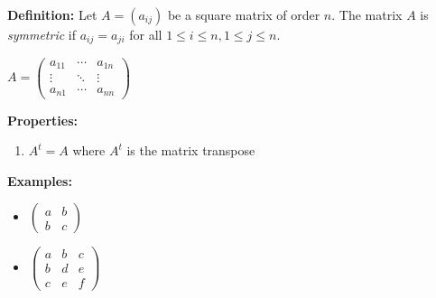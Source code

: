 \documentclass[12pt]{article}
\begin{document}

\textbf{Definition:} \newline Let $A=(a_{ij})$ be a square matrix of
order $n$.  The matrix $A$ is \emph{symmetric} if $a_{ij} = a_{ji}$
for all $1 \leq i \leq n, 1 \leq j \leq n$.
\begin{center}$A =
\begin{pmatrix}
  a_{11} & \cdots & a_{1n} \\
  \vdots & \ddots & \vdots \\
  a_{n1} & \cdots & a_{nn}
\end{pmatrix}$
\end{center}

\textbf{Properties:}
\begin{enumerate}
  \item $A^t = A$ where $A^t$ is the matrix transpose
\end{enumerate}

\textbf{Examples:}
\begin{itemize}
  \item $\begin{pmatrix}
    a & b \\
    b & c 
  \end{pmatrix}$
  \item $\begin{pmatrix}
    a & b & c \\
    b & d & e \\
    c & e & f 
  \end{pmatrix}$
\end{itemize}
\end{document}
